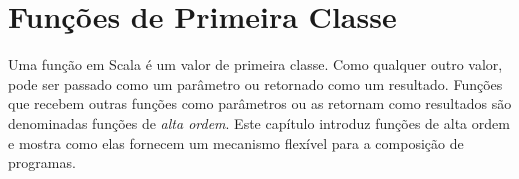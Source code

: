 

 \chapter{\label{chap:first-class-funs}Fun\c{c}\~{o}es de Primeira Classe}
Uma fun\c{c}\~{a}o em Scala \'{e} um valor de primeira classe. Como qualquer outro valor, 
pode ser passado como um par\^{a}metro ou retornado como um resultado. Fun\c{c}\~{o}es que 
recebem outras fun\c{c}\~{o}es como par\^{a}metros ou as retornam como resultados s\~{a}o 
denominadas fun\c{c}\~{o}es de {\em alta ordem}. Este cap\'{i}tulo introduz fun\c{c}\~{o}es de alta ordem 
e mostra como elas fornecem um mecanismo flex\'{i}vel para a composi\c{c}\~{a}o de programas.

